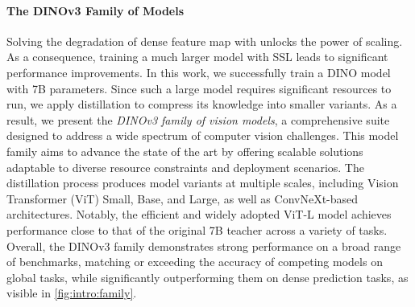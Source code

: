 \paragraph{The DINOv3 Family of Models} 
Solving the degradation of dense feature map with \gramname unlocks the power of scaling.
As a consequence, training a much larger model with SSL leads to significant performance improvements. 
In this work, we successfully train a DINO model with 7B parameters. 
Since such a large model requires significant resources to run, we apply distillation to compress its knowledge into smaller variants. 
As a result, we present the \emph{DINOv3 family of vision models}, a comprehensive suite designed to address a wide spectrum of computer vision challenges. 
This model family aims to advance the state of the art by offering scalable solutions adaptable to diverse resource constraints and deployment scenarios.
The distillation process produces model variants at multiple scales, including Vision Transformer (ViT) Small, Base, and Large, as well as ConvNeXt-based architectures.
Notably, the efficient and widely adopted ViT-L model achieves performance close to that of the original 7B teacher across a variety of tasks. 
Overall, the DINOv3 family demonstrates strong performance on a broad range of benchmarks, matching or exceeding the accuracy of competing models on global tasks, while significantly outperforming them on dense prediction tasks, as visible in \cref{fig:intro:family}.




    
             


        
                            

            

            
                
        
                            

            

            
                
        
            


            

            
        
            


            

            
        
            



